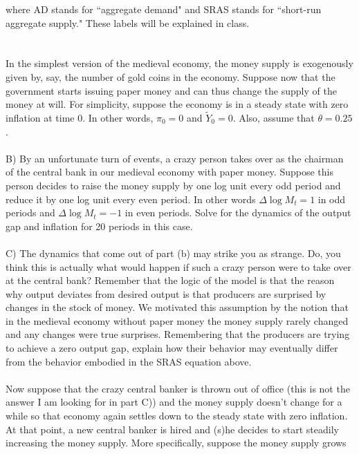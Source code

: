 \begin{homeworkProblem}[2]
    
    where AD stands for ``aggregate demand" and SRAS stands for ``short-run 
    aggregate supply." These labels will be explained in class.
    \\ \\ \\
    In the simplest version of the medieval economy, the money supply is
    exogenously given by, say, the number of gold coins in the economy. 
    Suppose now that the government starts issuing paper money and can thus
    change the supply of the money at will. For simplicity, suppose the 
    economy is in a steady state with zero inflation at time 0. In other 
    words, $\pi_0 = 0$ and $\widetilde{Y}_0 = 0$. Also, assume that $\theta = 0.25$. 
    \\ \\
    B) By an unfortunate turn of events, a crazy person takes over as the 
    chairman of the central bank in our medieval economy with paper money. 
    Suppose this person decides to raise the money supply by one log unit 
    every odd period and reduce it by one log unit every even period. In
    other words $\Delta \log M_t = 1$ in odd periods and $\Delta \log M_t
    = -1$ in even periods. Solve for the dynamics of the output gap and
    inflation for 20 periods in this case.
    \\ \\
    C) The dynamics that come out of part (b) may strike you as strange. 
    Do, you think this is actually what would happen if such a crazy 
    person were to take over at the central bank? Remember that the logic
    of the model is that the reason why output deviates from desired output
    is that producers are surprised by changes in the stock of money. We 
    motivated this assumption by the notion that in the medieval economy 
    without paper money the money supply rarely changed and any changes 
    were true surprises. Remembering that the producers are trying to 
    achieve a zero output gap, explain how their behavior may eventually 
    differ from the behavior embodied in the SRAS equation above.
    \\ \\
    Now suppose that the crazy central banker is thrown out of office 
    (this is not the answer I am looking for in part C)) and the money 
    supply doesn’t change for a while so that economy again settles 
    down to the steady state with zero inflation. At that point, a new 
    central banker is hired and (s)he decides to start steadily increasing 
    the money supply. More specifically, suppose the money supply grows 

\end{homeworkProblem}
